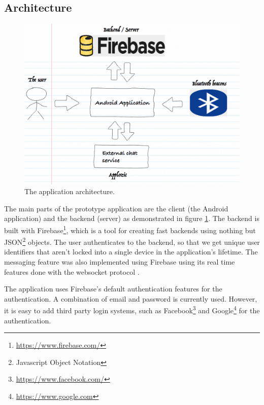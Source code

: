 \subsection{Architecture}


\begin{figure}[htb]
	\begin{center}
		\includegraphics[width=1\textwidth]{fs_architecture.png}
		\caption{The application architecture.}
		\label{fig:fs_architecture}
	\end{center}
\end{figure}

The main parts of the prototype application are the client (the Android application) and the backend (server) as demonstrated in figure \ref{fig:fs_architecture}. The backend is built with Firebase\footnote{\url{https://www.firebase.com/}}, which is a tool for creating fast backends using nothing but JSON\footnote{Javascript Object Notation} objects. The user authenticates to the backend, so that we get unique user identifiers that aren't locked into a single device in the application's lifetime. The messaging feature was also implemented using Firebase using its real time features done with the websocket protocol \citep{rfc6455}.

The application uses Firebase's default authentication features for the authentication. A combination of email and password is currently used. However, it is easy to add third party login systems, such as Facebook\footnote{\url{https://www.facebook.com/}} and Google\footnote{\url{https://www.google.com}} for the authentication.

